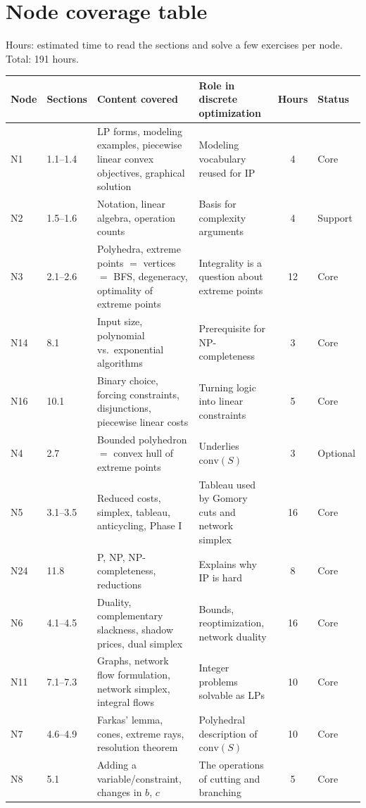 \documentclass[11pt,a4paper]{article}
\begin{document}
\section{Node coverage table}
Hours: estimated time to read the sections and solve a few exercises per node. Total: 191 hours.
\footnotesize
\begin{longtable}{@{}l L{1.5cm} L{4.9cm} L{4.9cm} c l@{}}
\toprule
\textbf{Node} & \textbf{Sections} & \textbf{Content covered} & \textbf{Role in discrete optimization} & \textbf{Hours} & \textbf{Status}\\
\midrule
\endhead
\bottomrule
\endfoot
N1 & 1.1--1.4 & LP forms, modeling examples, piecewise linear convex objectives, graphical solution & Modeling vocabulary reused for IP & 4 & Core\\
N2 & 1.5--1.6 & Notation, linear algebra, operation counts & Basis for complexity arguments & 4 & Support\\
N3 & 2.1--2.6 & Polyhedra, extreme points $=$ vertices $=$ BFS, degeneracy, optimality of extreme points & Integrality is a question about extreme points & 12 & Core\\
N14 & 8.1 & Input size, polynomial vs.\ exponential algorithms & Prerequisite for NP-completeness & 3 & Core\\
N16 & 10.1 & Binary choice, forcing constraints, disjunctions, piecewise linear costs & Turning logic into linear constraints & 5 & Core\\
N4 & 2.7 & Bounded polyhedron $=$ convex hull of extreme points & Underlies $\mathrm{conv}(S)$ & 3 & Optional\\
N5 & 3.1--3.5 & Reduced costs, simplex, tableau, anticycling, Phase I & Tableau used by Gomory cuts and network simplex & 16 & Core\\
N24 & 11.8 & P, NP, NP-completeness, reductions & Explains why IP is hard & 8 & Core\\
N6 & 4.1--4.5 & Duality, complementary slackness, shadow prices, dual simplex & Bounds, reoptimization, network duality & 16 & Core\\
N11 & 7.1--7.3 & Graphs, network flow formulation, network simplex, integral flows & Integer problems solvable as LPs & 10 & Core\\
N7 & 4.6--4.9 & Farkas' lemma, cones, extreme rays, resolution theorem & Polyhedral description of $\mathrm{conv}(S)$ & 10 & Core\\
N8 & 5.1 & Adding a variable/constraint, changes in $b$, $c$ & The operations of cutting and branching & 5 & Core\\

\end{longtable}
\end{document}
